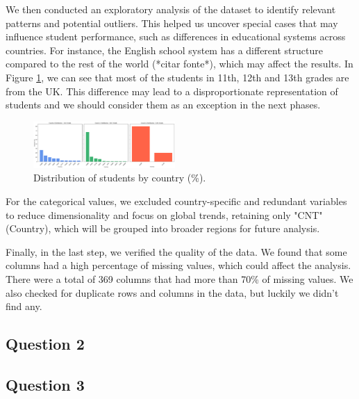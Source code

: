We then conducted an exploratory analysis of the dataset to identify relevant patterns and potential outliers. This helped us uncover special cases that may influence student performance, such as differences in educational systems across countries.
For instance, the English school system has a different structure compared to the rest of the world (*citar fonte*), which may affect the results.
In Figure \ref{fig:country_distribution}, we can see that most of the students in 11th, 12th and 13th grades are from the UK. This difference may lead to a disproportionate representation of students and we should consider them as an exception in the next phases.

\begin{figure}[H]
    \centering
    \includegraphics[width=0.48\textwidth]{figures/Q1_CountryDistri.png}
    \caption{Distribution of students by country (\%).}
    \label{fig:country_distribution}
\end{figure}

For the categorical values, we excluded country-specific and redundant variables to reduce dimensionality and focus on global trends, retaining only "CNT" (Country), which will be grouped into broader regions for future analysis.

Finally, in the last step, we verified the quality of the data. We found that some columns had a high percentage of missing values, which could affect the analysis. There were a total of 369 columns that had more than 70\% of missing values.
We also checked for duplicate rows and columns in the data, but luckily we didn't find any.

\subsection{Question 2}

\subsection{Question 3}
